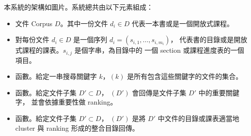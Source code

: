 本系統的架構如圖片。系統總共由以下元素組成：

\begin{itemize}
  \item 文件 Corpus $D$。其中一份文件 $d_i\in D$ 代表一本書或是一個開放式課程。
  \item 對每份文件 $d_i\in D$ 是一個序列 $d_i = (s_{i,1},\dots,s_{i,m_i})$，
        代表書的目錄或是開放式課程的課表。$s_{i,j}$ 是個字串，為目錄中的
        一個 section 或課程進度表的一個項目。
  \item {} 函數。給定一串搜尋關鍵字 $k$，$(k)$
        是所有包含這些關鍵字的文件的集合。
  \item {} 函數。給定文件子集 $D'\subset D$，
        $(D')$ 會回傳是文件子集 $D'$ 中的重要關鍵字，
        並會依據重要性做 ranking。
  \item {} 函數。給定文件子集 $D'\subset D$，
        $(D')$ 是將 $D'$ 中文件的目錄或課表適當地 cluster
        與 ranking 形成的整合目錄回傳。
\end{itemize}
